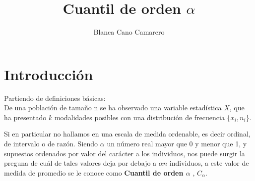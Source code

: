\documentclass[a4paper , 11pt, spanish ]{article}
\title{Cuantil de orden $\alpha$}
\author{Blanca Cano Camarero}
\begin{document}
\maketitle

\section*{Introducción}
Partiendo de definiciones básicas: \\ 
De una población de tamaño n se ha observado una variable estadística $X$, que ha presentado $k$ modalidades posibles con una distribución de frecuencia \{$x_{i} , n_{i}$\}.  \par 
Si en particular no hallamos en una escala de medida ordenable, es decir ordinal, de intervalo o de razón. Siendo $\alpha$ un número real mayor que 0 y menor que 1,  y supuestos ordenados por valor del carácter a los individuos, nos puede surgir la preguna de cuál de tales valores deja por debajo a $\alpha n$  individuos, a este valor de medida de promedio se le conoce como \textbf{Cuantil de orden $\alpha$ }, $C_{\alpha}$.  
\par

\end{document}
